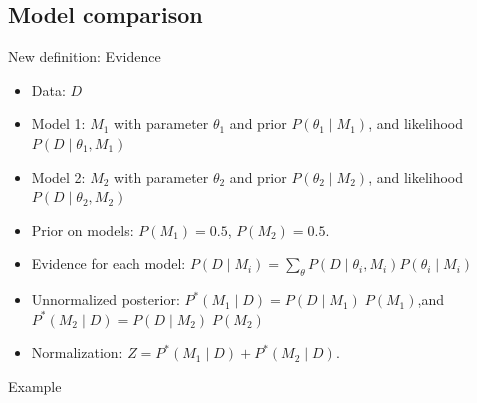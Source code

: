\subsection{Model comparison}
\no New definition: Evidence
\begin{itemize}
	\item Data: $D$
	\item Model 1: $M_1$ with parameter $\theta_1$ and prior $P(\theta_1\;|\; M_1)$, and likelihood $P(D\;|\;\theta_1, M_1)$
	\item Model 2: $M_2$ with parameter $\theta_2$ and prior $P(\theta_2\;|\; M_2)$, and likelihood $P(D\;|\;\theta_2, M_2)$
	\item Prior on models: $P(M_1) = 0.5$, \; $P(M_2) = 0.5$.
	\item Evidence for each model: $P(D\;|\;M_i) = \sum_\theta P(D\;|\;\theta_i, M_i) P(\theta_i\;|\;M_i)$
	\item Unnormalized posterior: $P^\ast(M_1\;|\;D) = P(D\;|\;M_1) \; P(M_1)$,\quad and $P^\ast(M_2\;|\;D) = P(D\;|\;M_2) \; P(M_2)$
	\item Normalization: $Z = P^\ast(M_1\;|\;D) + P^\ast(M_2\;|\;D)$.
\end{itemize}
Example

